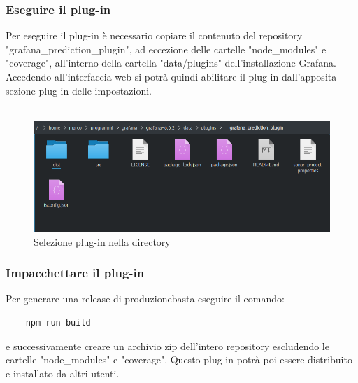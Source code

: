 \subsubsection{Eseguire il plug-in}%
Per eseguire il plug-in è necessario copiare il contenuto del repository "grafana\_prediction\_plugin", ad eccezione delle cartelle "node\_modules" e "coverage", all'interno della cartella "data/plugins" dell'installazione Grafana\glo. Accedendo all'interfaccia web si potrà quindi abilitare il plug-in dall'apposita sezione plug-in delle impostazioni.
\\
\\
\begin{figure}[H] 	
	\begin{center}
		\includegraphics[width=\textwidth,height=\textheight,keepaspectratio]{img/plugin-directory.png}
	\end{center}
	\caption{Selezione plug-in nella directory}	
\end{figure}

\subsubsection{Impacchettare il plug-in}%
Per generare una release di produzione\glosp basta eseguire il comando:
\begin{verbatim}
	npm run build	
\end{verbatim}
e successivamente creare un archivio zip dell'intero repository escludendo le cartelle "node\_modules" e "coverage". Questo plug-in potrà poi essere distribuito e installato da altri utenti. 
